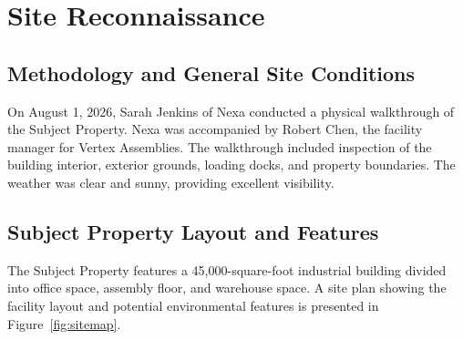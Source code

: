\section{Site Reconnaissance}

\subsection{Methodology and General Site Conditions}
On August 1, 2026, Sarah Jenkins of Nexa conducted a physical walkthrough of the Subject Property. Nexa was accompanied by Robert Chen, the facility manager for Vertex Assemblies. The walkthrough included inspection of the building interior, exterior grounds, loading docks, and property boundaries. The weather was clear and sunny, providing excellent visibility.

\subsection{Subject Property Layout and Features}
The Subject Property features a 45,000-square-foot industrial building divided into office space, assembly floor, and warehouse space. A site plan showing the facility layout and potential environmental features is presented in Figure~\ref{fig:sitemap}.

